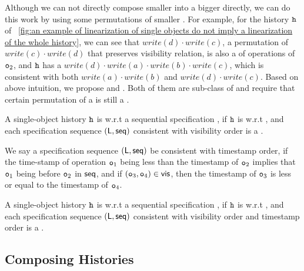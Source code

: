 Although we can not directly compose smaller \crdtlinearization{} into a bigger \crdtlinearization{} directly, we can do this work by using some permutations of smaller \crdtlinearization{}. For example, for the history $\mathtt{h}$ of \figurename~\ref{fig:an example of linearization of single objects do not imply a linearization of the whole history}, we can see that $\mathit{write}(d) \cdot \mathit{write}(c)$, a permutation of \crdtlinearization{} $\mathit{write}(c) \cdot \mathit{write}(d)$ that preserves visibility relation, is also a \crdtlinearization{} of operations of $\mathtt{o}_2$, and $\mathtt{h}$ has a \crdtlinearization{} $\mathit{write}(d) \cdot \mathit{write}(a) \cdot \mathit{write}(b) \cdot \mathit{write}(c)$, which is consistent with both $\mathit{write}(a) \cdot \mathit{write}(b)$ and $\mathit{write}(d) \cdot \mathit{write}(c)$. Based on above intuition, we propose \tzerolin{} and \tonelin{}. Both of them are sub-class of \crdtlin{} and require that certain permutation of a \crdtlinearization{} is still a \crdtlinearization{}.

\begin{definition}[\tzerolin{}]
\label{definition:t0-linearizability}
A single-object history $\mathtt{h}$ is \tzerolinearizable{} w.r.t a sequential specification \Spec{}, if $\mathtt{h}$ is \crdtlinearizable{} w.r.t \Spec{}, and each specification sequence $(\mathsf{L}, \mathsf{seq})$ consistent with visibility order is a \crdtlinearization{}.
\end{definition}

We say a specification sequence $(\mathsf{L}, \mathsf{seq})$ be consistent with timestamp order, if the time-stamp of operation $\mathtt{o}_1$ being less than the timestamp of $\mathtt{o}_2$ implies that $\mathtt{o}_1$ being before $\mathtt{o}_2$ in $\mathsf{seq}$, and if $(\mathtt{o}_3,\mathtt{o}_4) \in \mathsf{vis}$, then the timestamp of $\mathtt{o}_3$ is less or equal to the timestamp of $\mathtt{o}_4$.

\begin{definition}[\tonelin{}]
\label{definition:t1-linearizability}
A single-object history $\mathtt{h}$ is \tonelinearizable{} w.r.t a sequential specification \Spec{}, if $\mathtt{h}$ is \crdtlinearizable{} w.r.t \Spec{}, and each specification sequence $(\mathsf{L}, \mathsf{seq})$ consistent with visibility order and timestamp order is a \crdtlinearization{}.
\end{definition}






\subsection{Composing Histories}
\label{lemma:composing histories}

